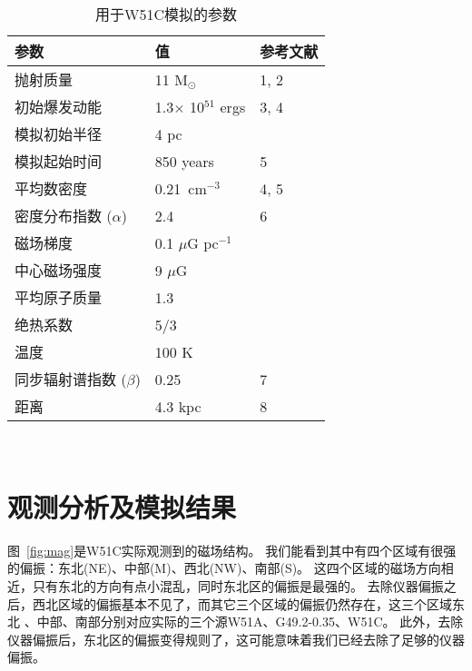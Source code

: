 \begin{table*}
  \caption{用于W51C模拟的参数}
  \label{table:parameters}
  \centering
  \begin{tabular}{l l l}
      \hline\hline
      参数                         & 值              & 参考文献               \\
      \hline
      抛射质量                      & 11 M$_{\odot}$ & 1, 2\\
      初始爆发动能                  & 1.3$\times$ 10$^{51}$ ergs & 3, 4\\
      模拟初始半径                  & 4 pc            &\\
      模拟起始时间                  & 850 years       & 5\\
      \hline
      平均数密度                    & 0.21\ cm$^{-3}$ & 4, 5\\
      密度分布指数 ($\alpha$)       & 2.4             & 6\\
      磁场梯度                      & 0.1 $\mu$G pc$^{-1}$    &\\
      中心磁场强度                  & 9 $\mu$G        &\\
      平均原子质量                  & 1.3             &\\
      绝热系数                      & 5/3             &\\
      温度                         & 100 K           &\\
      \hline
      同步辐射谱指数 ($\beta$)       & 0.25            & 7\\
      距离                          & 4.3 kpc         & 8\\
      \hline
  \end{tabular}\\
\end{table*}




\section{观测分析及模拟结果}
\label{W51Cres}

图~\ref{fig:mag}是W51C实际观测到的磁场结构。
我们能看到其中有四个区域有很强的偏振：东北(NE)、中部(M)、西北(NW)、南部(S)。
这四个区域的磁场方向相近，只有东北的方向有点小混乱，同时东北区的偏振是最强的。
去除仪器偏振之后，西北区域的偏振基本不见了，而其它三个区域的偏振仍然存在，这三个区域东北
、中部、南部分别对应实际的三个源W51A、G49.2-0.35、W51C。
此外，去除仪器偏振后，东北区的偏振变得规则了，这可能意味着我们已经去除了足够的仪器偏振。


